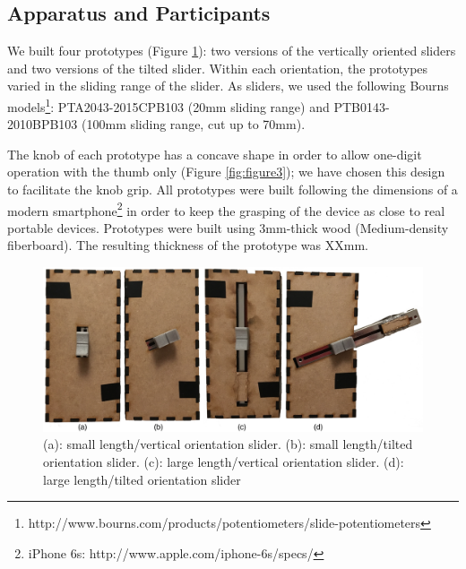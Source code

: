 \documentclass{sigchi}
\begin{document}
\subsection{Apparatus and Participants}
We built four prototypes (Figure \ref{fig:figure2}): two versions of the vertically oriented sliders and two versions of the tilted slider. Within each orientation, the prototypes varied in the sliding range of the slider. As sliders, we used the following Bourns models\footnote{http://www.bourns.com/products/potentiometers/slide-potentiometers}: PTA2043-2015CPB103 (20mm sliding range) and PTB0143-2010BPB103 (100mm sliding range, cut up to 70mm).

The knob of each prototype has a concave shape in order to allow one-digit operation with the thumb only (Figure \ref{fig:figure3}); we have chosen this design to facilitate the knob grip. All prototypes were built following the dimensions of a modern smartphone\footnote{iPhone 6s: http://www.apple.com/iphone-6s/specs/} in order to keep the grasping of the device as close to real portable devices. Prototypes were built using 3mm-thick wood (Medium-density fiberboard). The resulting thickness of the prototype was XXmm. 

\begin{figure}[h]
\centering
  \includegraphics[width=1\columnwidth]{figures/prototypes}
  \caption{(a): small length/vertical orientation slider. (b): small length/tilted orientation slider. (c): large length/vertical orientation slider. (d): large length/tilted orientation slider}
  \label{fig:figure2}
\end{figure}
\end{document}
